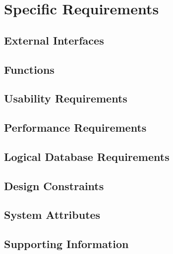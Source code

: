 \chapter{Specific Requirements}

\section{External Interfaces}

\section{Functions}

\section{Usability Requirements}

\section{Performance Requirements}

\section{Logical Database Requirements}

\section{Design Constraints}

\section{System Attributes}

\section{Supporting Information}
